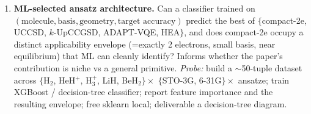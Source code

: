 \begin{enumerate}
\item \textbf{ML-selected ansatz architecture.} Can a classifier trained on
$(\text{molecule}, \text{basis}, \text{geometry}, \text{target accuracy})$
predict the best of $\{$compact-2e, UCCSD, $k$-UpCCGSD, ADAPT-VQE, HEA$\}$,
and does compact-2e occupy a distinct applicability envelope (=exactly 2
electrons, small basis, near equilibrium) that ML can cleanly identify?
Informs whether the paper's contribution is niche vs a general primitive.
\emph{Probe:} build a $\sim$50-tuple dataset across
$\{$H$_2$, HeH$^+$, H$_3^+$, LiH, BeH$_2\}\times$
$\{$STO-3G, 6-31G$\}\times$ ansatze; train XGBoost / decision-tree classifier;
report feature importance and the resulting envelope; free sklearn local;
deliverable a decision-tree diagram.

\end{enumerate}
